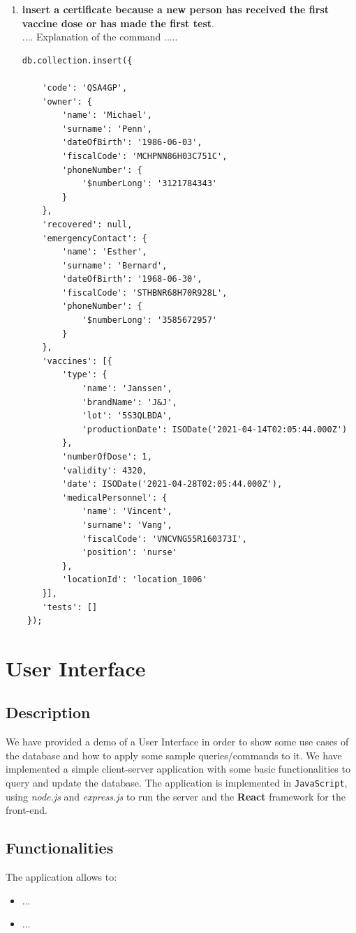\documentclass{article}
\begin{document}
\begin{enumerate}
\begin{lstlisting}
        });
    \end{lstlisting}
    \item \textbf{insert a certificate because a new person has received the first vaccine dose or has made the first test}.\\ .... Explanation of the command .....
    \begin{lstlisting}
db.collection.insert({
    
    'code': 'QSA4GP',
    'owner': {
        'name': 'Michael',
        'surname': 'Penn',
        'dateOfBirth': '1986-06-03',
        'fiscalCode': 'MCHPNN86H03C751C',
        'phoneNumber': {
            '$numberLong': '3121784343'
        }
    },
    'recovered': null,
    'emergencyContact': {
        'name': 'Esther',
        'surname': 'Bernard',
        'dateOfBirth': '1968-06-30',
        'fiscalCode': 'STHBNR68H70R928L',
        'phoneNumber': {
            '$numberLong': '3585672957'
        }
    },
    'vaccines': [{
        'type': {
            'name': 'Janssen',
            'brandName': 'J&J',
            'lot': '5S3QLBDA',
            'productionDate': ISODate('2021-04-14T02:05:44.000Z')
        },
        'numberOfDose': 1,
        'validity': 4320,
        'date': ISODate('2021-04-28T02:05:44.000Z'),
        'medicalPersonnel': {
            'name': 'Vincent',
            'surname': 'Vang',
            'fiscalCode': 'VNCVNG55R160373I',
            'position': 'nurse'
        },
        'locationId': 'location_1006'
    }],
    'tests': []
 });
    \end{lstlisting}
\end{enumerate}
\section{User Interface}
    \subsection{Description}
    We have provided a demo of a User Interface in order to show some use cases of the database and how to apply some sample queries/commands to it. We have implemented a simple client-server application with some basic functionalities to query and update the database. The application is implemented in \verb|JavaScript|, using \textit{node.js} and \textit{express.js} to run the server and the \textbf{React} framework for the front-end.
    \subsection{Functionalities}
    The application allows to:
    \begin{itemize}
    \item ...
    \item ...
    \end{itemize}
\end{document}
